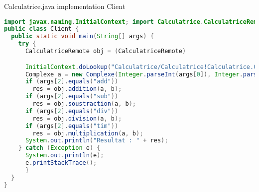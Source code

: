 \documentclass{article}
\begin{document}
Calculatrice.java implementation Client
\begin{lstlisting}[language=JAVA]
import javax.naming.InitialContext; import Calculatrice.CalculatriceRemote; import Calculatrice.Complexe;
public class Client {
  public static void main(String[] args) {
    try {
      CalculatriceRemote obj = (CalculatriceRemote)

      InitialContext.doLookup("Calculatrice/Calculatrice!Calculatrice.CalculatriceRemote");
      Complexe a = new Complexe(Integer.parseInt(args[0]), Integer.parseInt(args[1])); Complexe b = new Complexe(Integer.parseInt(args[3]), Integer.parseInt(args[4])); Complexe res = new Complexe(0, 0);
      if (args[2].equals("add"))
        res = obj.addition(a, b);
      if (args[2].equals("sub"))
        res = obj.soustraction(a, b);
      if (args[2].equals("div"))
        res = obj.division(a, b);
      if (args[2].equals("tim"))
        res = obj.multiplication(a, b);
      System.out.println("Resultat : " + res);
    } catch (Exception e) {
      System.out.println(e);
      e.printStackTrace();
      }
  }
}
\end{lstlisting}
\end{document}
